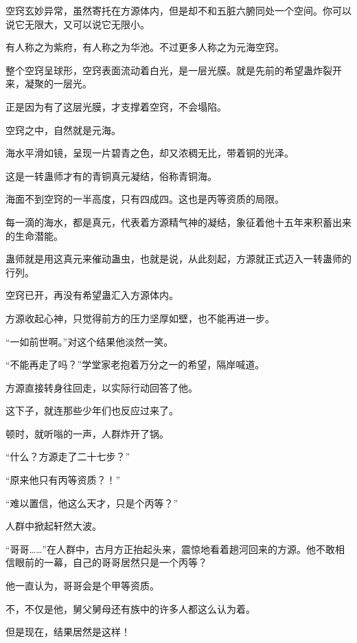
\begin{this_body}



空窍玄妙异常，虽然寄托在方源体内，但是却不和五脏六腑同处一个空间。你可以说它无限大，又可以说它无限小。

有人称之为紫府，有人称之为华池。不过更多人称之为元海空窍。

整个空窍呈球形，空窍表面流动着白光，是一层光膜。就是先前的希望蛊炸裂开来，凝聚的一层光。

正是因为有了这层光膜，才支撑着空窍，不会塌陷。

空窍之中，自然就是元海。

海水平滑如镜，呈现一片碧青之色，却又浓稠无比，带着铜的光泽。

这是一转蛊师才有的青铜真元凝结，俗称青铜海。

海面不到空窍的一半高度，只有四成四。这也是丙等资质的局限。

每一滴的海水，都是真元，代表着方源精气神的凝结，象征着他十五年来积蓄出来的生命潜能。

蛊师就是用这真元来催动蛊虫，也就是说，从此刻起，方源就正式迈入一转蛊师的行列。

空窍已开，再没有希望蛊汇入方源体内。

方源收起心神，只觉得前方的压力坚厚如壁，也不能再进一步。

“一如前世啊。”对这个结果他淡然一笑。

“不能再走了吗？”学堂家老抱着万分之一的希望，隔岸喊道。

方源直接转身往回走，以实际行动回答了他。

这下子，就连那些少年们也反应过来了。

顿时，就听嗡的一声，人群炸开了锅。

“什么？方源走了二十七步？”

“原来他只有丙等资质？！”

“难以置信，他这么天才，只是个丙等？”

人群中掀起轩然大波。

“哥哥……”在人群中，古月方正抬起头来，震惊地看着趟河回来的方源。他不敢相信眼前的一幕，自己的哥哥居然只是一个丙等？

他一直认为，哥哥会是个甲等资质。

不，不仅是他，舅父舅母还有族中的许多人都这么认为着。

但是现在，结果居然是这样！


\end{this_body}
